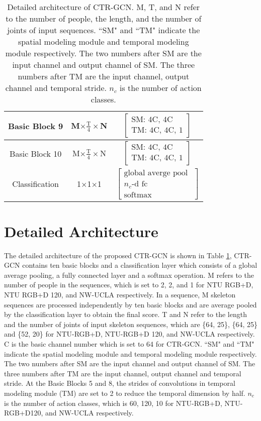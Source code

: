 \documentclass[10pt,twocolumn,letterpaper]{article}
\begin{document}
\begin{table}[!h]
\begin{center}
\begin{tabular}{c|c|c}
			\hline
			Basic Block 9& M$\times$$\frac{\text{T}}{\text{4}}\times$N & $\begin{bmatrix}\text{SM: 4C, 4C }\\ \text{TM: 4C, 4C, 1}\end{bmatrix}$\\
			\hline
			Basic Block 10& M$\times$$\frac{\text{T}}{\text{4}}\times$N & $\begin{bmatrix}\text{SM: 4C, 4C}\\ \text{TM: 4C, 4C, 1}\end{bmatrix}$\\
			\hline
			Classification& 1$\times$1$\times$1 & $ \begin{bmatrix}\text{global averge pool }\\ \text{$n_c$-d fc} \\ \text{softmax}\end{bmatrix}$\\
			\hline
		\end{tabular}
	\end{center}
\caption{Detailed architecture of CTR-GCN. M, T, and N refer to the number of people, the length, and the number of joints of input sequences. ``SM" and ``TM" indicate the spatial modeling module and temporal modeling module respectively. The two numbers after SM are the input channel and output channel of SM. The three numbers after TM are the input channel, output channel and temporal stride. $n_c$ is the number of action classes.}
	\label{tab:archi}
\end{table}



\section*{Detailed Architecture}

The detailed architecture of the proposed CTR-GCN is shown in Table \ref{tab:archi}, CTR-GCN contains ten basic blocks and a classification layer which consists of a global average pooling, a fully connected layer and a softmax operation. M refers to the number of people in the sequences, which is set to 2, 2, and 1 for NTU RGB+D, NTU RGB+D 120, and NW-UCLA respectively. In a sequence, M skeleton sequences are processed independently by ten basic blocks and are average pooled by the classification layer to obtain the final score. T and N refer to the length and the number of joints of input skeleton sequences, which are \{64, 25\}, \{64, 25\} and \{52, 20\} for NTU-RGB+D, NTU-RGB+D 120, and NW-UCLA respectively. C is the basic channel number which is set to 64 for CTR-GCN. ``SM" and ``TM" indicate the spatial modeling module and temporal modeling module respectively. The two numbers after SM are the input channel and output channel of SM. The three numbers after TM are the input channel, output channel and temporal stride. At the Basic Blocks 5 and 8, the strides of convolutions in temporal modeling module (TM) are set to 2 to reduce the temporal dimension by half. $n_c$ is the number of action classes, which is 60, 120, 10 for NTU-RGB+D, NTU-RGB+D120, and NW-UCLA respectively. 
\end{document}

